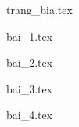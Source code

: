 \documentclass[12pt, a4paper, fleqn]{article}
\begin{document}
	
\thispagestyle{empty}
	
	{trang_bia.tex}

	\begin{center}
	    \tableofcontents
	\end{center}
	\clearpage
	
	
    {bai_1.tex}
	
	{bai_2.tex}
	
	{bai_3.tex}
	
	{bai_4.tex}
\end{document}
